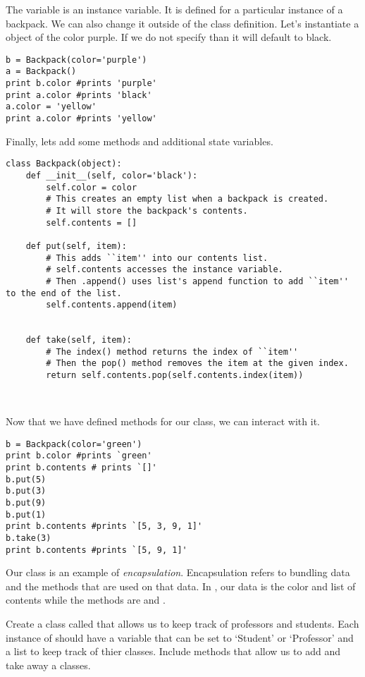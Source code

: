 The variable  is an instance variable. It is defined for a particular instance of a backpack.
We can also change it outside of the class definition.
Let's instantiate a  object of the color purple.
If we do not specify than it will default to black.

\begin{lstlisting}
b = Backpack(color='purple')
a = Backpack()
print b.color #prints 'purple'
print a.color #prints 'black'
a.color = 'yellow'
print a.color #prints 'yellow'
\end{lstlisting}


Finally, lets add some methods and additional state variables.

\begin{lstlisting}
class Backpack(object):
    def __init__(self, color='black'):
        self.color = color
        # This creates an empty list when a backpack is created. 
        # It will store the backpack's contents.
        self.contents = []

    def put(self, item):
        # This adds ``item'' into our contents list. 
        # self.contents accesses the instance variable.
        # Then .append() uses list's append function to add ``item'' to the end of the list.
        self.contents.append(item) 
        
        
    def take(self, item):
        # The index() method returns the index of ``item''
        # Then the pop() method removes the item at the given index.
        return self.contents.pop(self.contents.index(item)) 
        
        
\end{lstlisting}

Now that we have defined methods for our  class, we can interact with it.


\begin{lstlisting}
b = Backpack(color='green')
print b.color #prints `green'
print b.contents # prints `[]'
b.put(5)
b.put(3)
b.put(9)
b.put(1)
print b.contents #prints `[5, 3, 9, 1]'
b.take(3)
print b.contents #prints `[5, 9, 1]'
\end{lstlisting}

Our  class is an example of \emph{encapsulation}.
Encapsulation refers to bundling data and the methods that are used on that data.
In , our data is the color and list of contents while the methods are  and .

\begin{problem}
Create a class called  that allows us to keep track of professors and students.
Each instance of  should have a variable that can be set to `Student' or `Professor' and a list to keep track of thier classes.
Include methods that allow us to add and take away a classes.
\label{School}
\end{problem}

